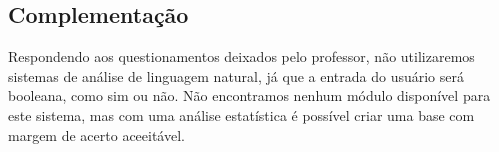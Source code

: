 \subsection{Complementação}

Respondendo aos questionamentos deixados pelo professor, não utilizaremos sistemas de análise de linguagem natural, já que a entrada do usuário será booleana, como sim ou não.
Não encontramos nenhum módulo disponível para este sistema, mas com uma análise estatística é possível criar uma base com margem de acerto aceeitável.